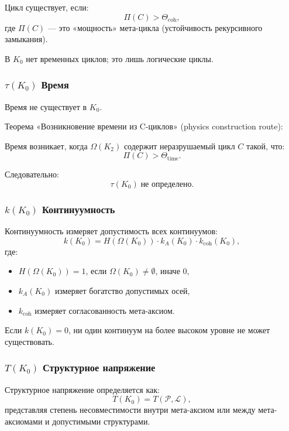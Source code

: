 Цикл существует, если:
\[
\Pi(C) > \Theta_{\mathrm{coh}},
\]
где $\Pi(C)$ — это «мощность» мета-цикла (устойчивость рекурсивного
замыкания).

В $K_0$ нет временных циклов; это лишь логические циклы.

\subsubsection{\texorpdfstring{$\tau(K_0)$}{\tau(K_0)} Время}

Время не существует в $K_0$.

Теорема «Возникновение времени из C-циклов» (physics construction route):

Время возникает, когда $\Omega(K_2)$ содержит неразрушаемый цикл
$C$ такой, что:
\[
\Pi(C) > \Theta_{\mathrm{time}}.
\]

Следовательно:
\[
\tau(K_0) \;\text{не определено}.
\]

\subsubsection{\texorpdfstring{$k(K_0)$}{k(K_0)} Континуумность}

Континуумность измеряет допустимость всех континуумов:
\[
k(K_0) =
H(\Omega(K_0)) \cdot
k_A(K_0) \cdot
k_{\mathrm{coh}}(K_0),
\]
где:
\begin{itemize}
    \item $H(\Omega(K_0)) = 1$, если $\Omega(K_0)\neq\emptyset$, иначе $0$,
    \item $k_A(K_0)$ измеряет богатство допустимых осей,
    \item $k_{\mathrm{coh}}$ измеряет согласованность мета-аксиом.
\end{itemize}

Если $k(K_0)=0$, ни один континуум на более высоком уровне не может
существовать.

\subsubsection{\texorpdfstring{$T(K_0)$}{T(K_0)} Структурное напряжение}

Структурное напряжение определяется как:
\[
T(K_0) = T(\mathcal{P}, \mathcal{L}),
\]
представляя степень несовместимости внутри мета-аксиом или между
мета-аксиомами и допустимыми структурами.

